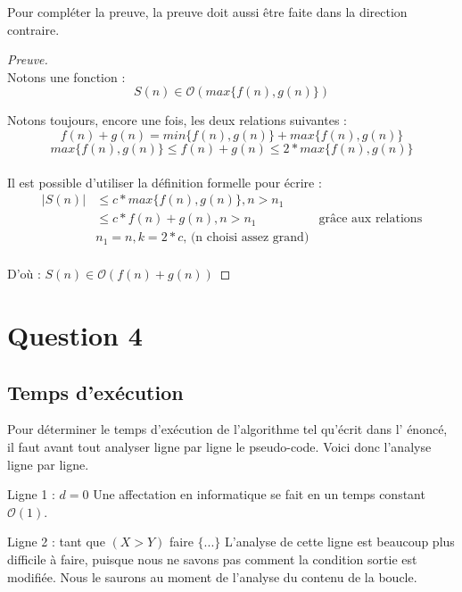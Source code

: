 \documentclass[12pt]{article}
\begin{document}
  \newpage

  \noindent \newline Pour compléter la preuve, la preuve doit aussi être faite
  dans la direction contraire. \newline

  \begin{proof}[Preuve]
    \noindent \\ Notons une fonction :
    \[ S(n) \in \mathcal{O}({max\{f(n), g(n)\}}) \]

    \noindent Notons toujours, encore une fois, les deux relations suivantes :
    \[ f(n) + g(n) = min\{f(n), g(n)\} + max\{f(n), g(n)\} \]
    \[ max\{f(n), g(n)\} \leq f(n) + g(n) \leq 2 * max\{f(n), g(n)\} \] \\

    \noindent Il est possible d'utiliser la définition formelle pour écrire :
    \begin{align*}
      | S(n) |  &\leq c * max\{f(n), g(n)\}, n > n_1 \\
                &\leq c * f(n) + g(n), n > n_1 &\text{grâce aux relations} \\
                & n_1 = n, k = 2 * c \text{, (n choisi assez grand)} \\
    \end{align*}

    \noindent D'où :
    \( S(n) \in \mathcal{O}(f(n) + g(n)) \)
  \end{proof}

  \newpage

  \section*{Question 4}
	\subsection*{Temps d'exécution}
    Pour déterminer le temps d'exécution de l'algorithme tel qu'écrit dans l'
    énoncé, il faut avant tout analyser ligne par ligne le pseudo-code. Voici
    donc l'analyse ligne par ligne. \newline

    Ligne 1 : \( d = 0 \) \newline
    Une affectation en informatique se fait en un temps constant
    \( \mathcal{O}(1) \). \newline

    Ligne 2 : tant que \( (X > Y) \) faire \( \{ ... \} \) \newline
    L'analyse de cette ligne est beaucoup plus difficile à faire, puisque nous
	  ne savons pas comment la condition sortie est modifiée. Nous le saurons au
    moment de l'analyse du contenu de la boucle. \newline
\end{document}
